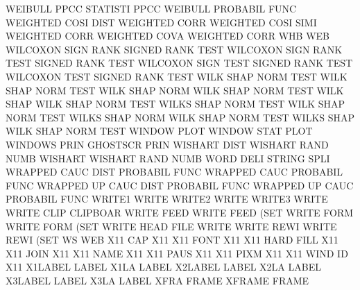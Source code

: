 WEIBULL  PPCC                           STATISTI PPCC
WEIBULL                                 PROBABIL FUNC
WEIGHTED COSI DIST                      WEIGHTED CORR
WEIGHTED COSI SIMI                      WEIGHTED CORR
WEIGHTED COVA                           WEIGHTED CORR
WHB                                     WEB
WILCOXON SIGN RANK                      SIGNED   RANK TEST
WILCOXON SIGN RANK TEST                 SIGNED   RANK TEST
WILCOXON SIGN TEST                      SIGNED   RANK TEST
WILCOXON TEST                           SIGNED   RANK TEST
WILK     SHAP NORM TEST                 WILK     SHAP NORM TEST
WILK     SHAP NORM                      WILK     SHAP NORM TEST
WILK     SHAP                           WILK     SHAP NORM TEST
WILKS    SHAP NORM TEST                 WILK     SHAP NORM TEST
WILKS    SHAP NORM                      WILK     SHAP NORM TEST
WILKS    SHAP                           WILK     SHAP NORM TEST
WINDOW   PLOT                           WINDOW   STAT PLOT
WINDOWS  PRIN                           GHOSTSCR PRIN
WISHART  DIST                           WISHART  RAND NUMB
WISHART                                 WISHART  RAND NUMB
WORD     DELI                           STRING   SPLI
WRAPPED  CAUC DIST                      PROBABIL FUNC
WRAPPED  CAUC                           PROBABIL FUNC
WRAPPED  UP   CAUC DIST                 PROBABIL FUNC
WRAPPED  UP   CAUC                      PROBABIL FUNC
WRITE1                                  WRITE
WRITE2                                  WRITE
WRITE3                                  WRITE
WRITE    CLIP                           CLIPBOAR
WRITE    FEED                           WRITE    FEED (SET
WRITE    FORM                           WRITE    FORM (SET
WRITE    HEAD FILE                      WRITE
WRITE    REWI                           WRITE    REWI (SET
WS                                      WEB
X11      CAP                            X11
X11      FONT                           X11
X11      HARD FILL                      X11
X11      JOIN                           X11
X11      NAME                           X11
X11      PAUS                           X11
X11      PIXM                           X11
X11      WIND ID                        X11
X1LABEL                                 LABEL
X1LA                                    LABEL
X2LABEL                                 LABEL
X2LA                                    LABEL
X3LABEL                                 LABEL
X3LA                                    LABEL
XFRA                                    FRAME
XFRAME                                  FRAME
